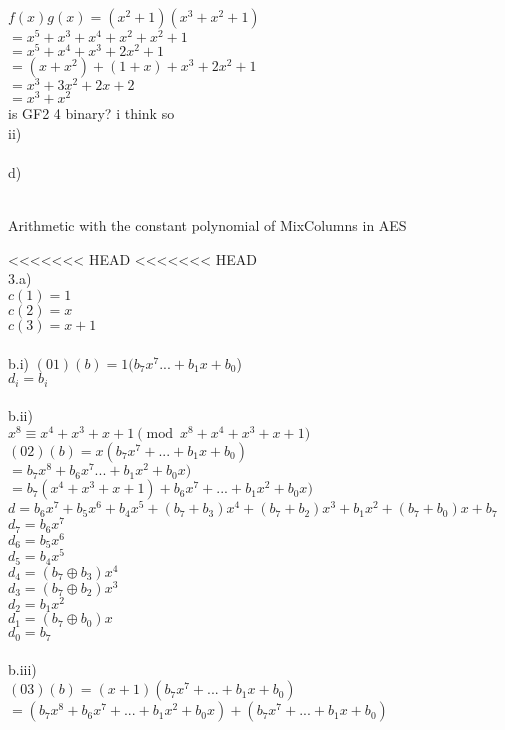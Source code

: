 \documentclass{assignment}
\begin{document}
\begin{problemlist}
\begin{problem}
\begin{answer}
$f(x)g(x)=(x^2+1)(x^3+x^2+1)$\\
$=x^5+x^3+x^4+x^2+x^2+1$\\
$=x^5+x^4+x^3+2x^2+1$\\
$=(x+x^2)+(1+x)+x^3+2x^2+1$\\
$=x^3+3x^2+2x+2$\\
$=x^3+x^2$\\  
is GF2 4  binary?   i think so
\\
ii)\\
\\
d)\\
\\
\end{answer}
\end{problem}

\pbitem Arithmetic with the constant polynomial of MixColumns in AES
\begin{problem}
\begin{answer}
<<<<<<< HEAD
<<<<<<< HEAD
\\
3.a)\\
$c(1)=1$\\
$c(2)=x$\\
$c(3)=x+1$\\
\\
b.i)   
$(01)(b)=1(b_7x^7...+b_1x+b_0$)\\
$d_i=b_i$\\
\\
b.ii)\\
$x^8\equiv x^4+x^3+x+1 \pmod {x^8+x^4+x^3+x+1}$\\
$(02)(b)=x(b_7x^7+...+b_1x+b_0)$\\
$=b_7x^8+b_6x^7...+b_1x^2+b_0x)$\\
$=b_7(x^4+x^3+x+1)+b_6x^7+...+b_1x^2+b_0x)$\\
$d=b_6x^7+b_5x^6+b_4x^5+(b_7+b_3)x^4+(b_7+b_2)x^3+b_1x^2+(b_7+b_0)x+b_7$\\
$d_7=b_6x^7$\\
$d_6=b_5x^6$\\
$d_5=b_4x^5$\\
$d_4=(b_7\oplus b_3)x^4$\\
$d_3=(b_7\oplus b_2)x^3$\\
$d_2=b_1x^2$\\
$d_1=(b_7\oplus b_0)x$\\
$d_0=b_7$\\
\\
b.iii)\\
$(03)(b)=(x+1)(b_7x^7+...+b_1x+b_0)$\\
$=(b_7x^8+b_6x^7+...+b_1x^2+b_0x)+(b_7x^7+...+b_1x+b_0)$\\

\end{answer}
\end{problem}
\end{problemlist}
\end{document}
